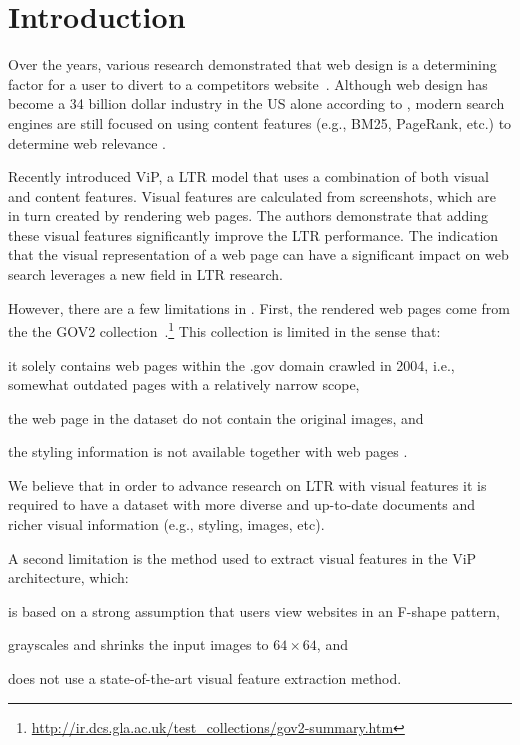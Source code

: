 
\section{Introduction}
Over the years, various research demonstrated that web design is a determining factor for a user to divert to a competitors website~\cite{nielsen1999designing,nielsen2006f,pernice2017f,wang2014eye}.
Although web design has become a 34 billion dollar industry in the US alone according to \citet{ibisdesign}, modern search engines are still focused on using content features (e.g., BM25, PageRank, etc.) to determine web relevance . 

Recently \citet{fan2017learning} introduced ViP, a \ac{LTR} model that uses a combination of both visual and content features.
Visual features are calculated from screenshots, which are in turn created by rendering web pages.
The authors demonstrate that adding these visual features significantly improve the \ac{LTR} performance.
The indication that the visual representation of a web page can have a significant impact on web search leverages a new field in \ac{LTR} research.

However, there are a few limitations in \cite{fan2017learning}.
First, the rendered web pages come from the the GOV2 collection~.\footnote{\url{http://ir.dcs.gla.ac.uk/test_collections/gov2-summary.htm}}
This collection is limited in the sense that:
\begin{inparaenum}[(i)]
\item it solely contains web pages within the .gov domain crawled in 2004, i.e., somewhat outdated pages with a relatively narrow scope,
\item the web page in the dataset do not contain the original images, and
\item the styling information is not available together with web pages .
\end{inparaenum}
We believe that in order to advance research on \ac{LTR} with visual features it is required to have a dataset with more diverse and up-to-date documents and richer visual information (e.g., styling, images, etc).

A second limitation is the method used to extract visual features in the ViP architecture, which: 
\begin{inparaenum}[(i)]
\item is based on a strong assumption that users view websites in an F-shape pattern, 
\item grayscales and shrinks the input images to $64\times64$, and
\item does not use a state-of-the-art visual feature extraction method.
\end{inparaenum}

